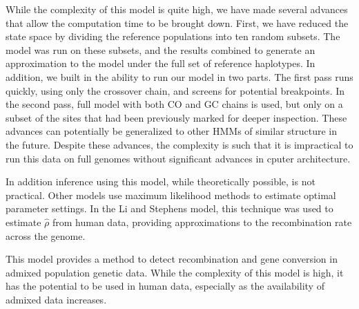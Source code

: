 While the complexity of this model is quite high, we have made several advances that allow the computation time to be brought down.
First, we have reduced the state space by dividing the reference populations into ten random subsets.
The model was run on these subsets, and the results combined to generate an approximation to the model under the full set of reference haplotypes.
In addition, we built in the ability to run our model in two parts.
The first pass runs quickly, using only the crossover chain, and screens for potential breakpoints.
In the second pass, full model with both CO and GC chains is used, but only on a subset of the sites that had been previously marked for deeper inspection.
These advances can potentially be generalized to other HMMs of similar structure in the future.
Despite these advances, the complexity is such that it is impractical to run this data on full genomes without significant advances in cputer architecture.

In addition inference using this model, while theoretically possible, is not practical.
Other models use maximum likelihood methods to estimate optimal parameter settings.
In the Li and Stephens model, this technique was used to estimate $\hat{\rho}$ from human data, providing approximations to the recombination rate across the genome.

This model provides a method to detect recombination and gene conversion in admixed population genetic data.
While the complexity of this model is high, it has the potential to be used in human data, especially as the availability of admixed data increases.




\clearpage
\renewcommand{\bibname}{References}

\begingroup
    \setlength{\bibsep}{10pt}
    \linespread{1}\selectfont
    
\endgroup

